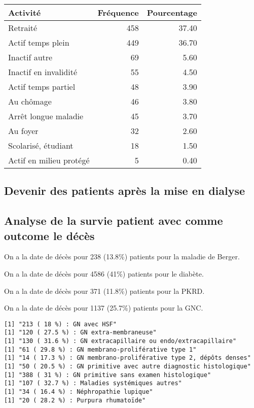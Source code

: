 \documentclass[11pt,a4paper]{article}\usepackage[]{graphicx}\usepackage[]{color}
\makeatletter
\newenvironment{kframe}{%
 \def\at@end@of@kframe{}%
 \ifinner\ifhmode%
  \def\at@end@of@kframe{\end{minipage}}%
  \begin{minipage}{\columnwidth}%
 \fi\fi%
 \def\FrameCommand##1{\hskip\@totalleftmargin \hskip-\fboxsep
 \colorbox{shadecolor}{##1}\hskip-\fboxsep
     \hskip-\linewidth \hskip-\@totalleftmargin \hskip\columnwidth}%
 \MakeFramed {\advance\hsize-\width
   \@totalleftmargin\z@ \linewidth\hsize
   \@setminipage}}%
 {\par\unskip\endMakeFramed%
 \at@end@of@kframe}
\newenvironment{knitrout}{}{} %
\makeatother
\begin{document}
\begin{table}[H]
\centering
\begin{tabular}{lrr}
  \hline
Activité & Fréquence & Pourcentage \\ 
  \hline
Retraité & 458 & 37.40 \\ 
  Actif temps plein & 449 & 36.70 \\ 
  Inactif autre &  69 & 5.60 \\ 
  Inactif en invalidité &  55 & 4.50 \\ 
  Actif temps partiel &  48 & 3.90 \\ 
  Au chômage &  46 & 3.80 \\ 
  Arrêt longue maladie &  45 & 3.70 \\ 
  Au foyer &  32 & 2.60 \\ 
  Scolarisé, étudiant &  18 & 1.50 \\ 
  Actif en milieu protégé &   5 & 0.40 \\ 
   \hline
\end{tabular}
\end{table}


  \subsection{Devenir des patients après la mise en dialyse}
  
  \subsection{Analyse de la survie patient avec comme outcome le décès}
  
  On a la date de décès pour 238 (13.8\%) patients pour la maladie de Berger.
  
  On a la date de décès pour 4586 (41\%) patients pour le diabète.
  
  On a la date de décès pour 371 (11.8\%) patients pour la PKRD.
  
  On a la date de décès pour 1137 (25.7\%) patients pour la GNC.

\begin{knitrout}
\color{fgcolor}\begin{kframe}
\begin{verbatim}
[1] "213 ( 18 %) : GN avec HSF"
[1] "120 ( 27.5 %) : GN extra-membraneuse"
[1] "130 ( 31.6 %) : GN extracapillaire ou endo/extracapillaire"
[1] "61 ( 29.8 %) : GN membrano-proliférative type 1"
[1] "14 ( 17.3 %) : GN membrano-proliférative type 2, dépôts denses"
[1] "50 ( 20.5 %) : GN primitive avec autre diagnostic histologique"
[1] "388 ( 31 %) : GN primitive sans examen histologique"
[1] "107 ( 32.7 %) : Maladies systémiques autres"
[1] "34 ( 16.4 %) : Néphropathie lupique"
[1] "20 ( 28.2 %) : Purpura rhumatoïde"
\end{verbatim}
\end{kframe}
\end{knitrout}
\end{document}
